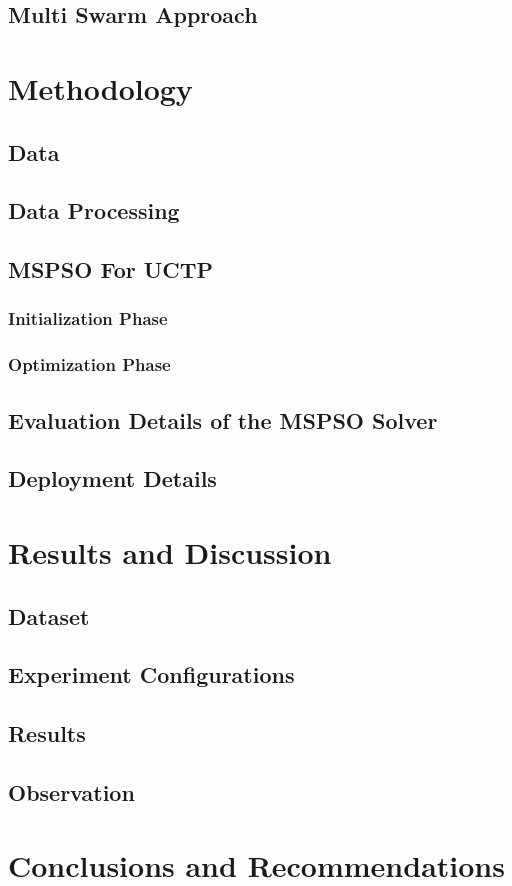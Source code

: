 \documentclass[sigconf]{acmart}
\begin{document}
    \subsection{Multi Swarm Approach}


\section{Methodology}
    \subsection{Data}
    \subsection{Data Processing}
    \subsection{MSPSO For UCTP}
        \subsubsection{Initialization Phase}
        \subsubsection{Optimization Phase}
    \subsection{Evaluation Details of the MSPSO Solver}
    \subsection{Deployment Details}

\section{Results and Discussion}
    \subsection{Dataset}
    \subsection{Experiment Configurations}
    \subsection{Results}
    \subsection{Observation}

\section{Conclusions and Recommendations}
\end{document}
